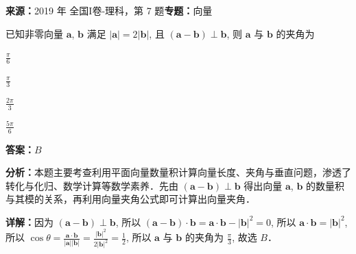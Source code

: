 \begin{question}[points=5]
\textbf{来源：}2019 年 全国I卷-理科，第 7 题\quad \textbf{专题：}向量\par
已知非零向量 $\mathbf{a}$, $\mathbf{b}$ 满足 $|\mathbf{a}| = 2|\mathbf{b}|$, 且 $(\mathbf{a} - \mathbf{b}) \perp \mathbf{b}$, 则 $\mathbf{a}$ 与 $\mathbf{b}$ 的夹角为
\begin{choices}
  \item $\frac{\pi}{6}$
  \item $\frac{\pi}{3}$
  \item $\frac{2\pi}{3}$
  \item $\frac{5\pi}{6}$
\end{choices}
\begin{solution}
\textbf{答案：}$B$

\textbf{分析：}本题主要考查利用平面向量数量积计算向量长度、夹角与垂直问题，渗透了转化与化归、数学计算等数学素养．先由 $(\mathbf{a} - \mathbf{b}) \perp \mathbf{b}$ 得出向量 $\mathbf{a}$, $\mathbf{b}$ 的数量积与其模的关系，再利用向量夹角公式即可计算出向量夹角．

\textbf{详解：}因为 $(\mathbf{a} - \mathbf{b}) \perp \mathbf{b}$, 所以 $(\mathbf{a} - \mathbf{b}) \cdot \mathbf{b} = \mathbf{a} \cdot \mathbf{b} - |\mathbf{b}|^2 = 0$, 所以 $\mathbf{a} \cdot \mathbf{b} = |\mathbf{b}|^2$, 所以 $\cos \theta = \frac{\mathbf{a} \cdot \mathbf{b}}{|\mathbf{a}| |\mathbf{b}|} = \frac{|\mathbf{b}|^2}{2|\mathbf{b}|^2} = \frac{1}{2}$, 所以 $\mathbf{a}$ 与 $\mathbf{b}$ 的夹角为 $\frac{\pi}{3}$, 故选 $B$．
\end{solution}
\end{question}

